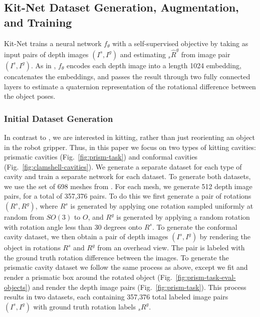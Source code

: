 \subsection{Kit-Net Dataset Generation, Augmentation, and Training}
\label{subsec:kit-net-training}
Kit-Net %
trains a neural network $f_\theta$ with a self-supervised objective by taking as input pairs of depth images $(I^s, I^g)$ and estimating ${_s}\hat{R}^g$ from image pair $(I^s, I^g)$. As in \citeauthor{CASE_Orienting}, $f_\theta$ encodes each depth image into a length 1024 embedding, concatenates the embeddings, and passes the result through two fully connected layers to estimate a quaternion representation of the rotational difference between the object poses. 

\subsubsection{Initial Dataset Generation}
In contrast to \citeauthor{CASE_Orienting}, we are interested in kitting, rather than just reorienting an object in the robot gripper. Thus, in this paper we focus on two types of kitting cavities: prismatic cavities (Fig.~\ref{fig:prism-task}) and conformal cavities (Fig.~\ref{fig:clamshell-cavities}).
We generate a separate dataset for each type of cavity and train a separate network for each dataset. 
To generate both datasets, we use the set of 698 meshes from \citet{mahler2019learning}. For each mesh, we generate 512 depth image pairs, for a total of 357,376 pairs. To do this we first generate a pair of rotations $(R^s, R^g)$, where $R^s$ is generated by applying one rotation sampled uniformly at random from $SO(3)$ to $O$, and $R^g$ is generated by applying a random rotation with rotation angle less than 30 degrees onto $R^s$. To generate the conformal cavity dataset, we then obtain a pair of depth images $(I^s, I^g)$ by rendering the object in rotations $R^s$ and $R^g$ from an overhead view. The pair is labeled with the ground truth rotation difference between the images. To generate the prismatic cavity dataset we follow the same process as above, except we fit and render a prismatic box around the rotated object (Fig.~\ref{fig:prism-task-eval-objects}) and render the depth image pairs (Fig.~\ref{fig:prism-task}). This process results in two datasets, each containing 357,376 total labeled image pairs $(I^s, I^g)$ with ground truth rotation labels ${_s}R^g$. 

